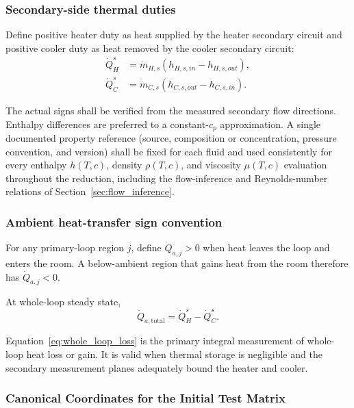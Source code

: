\documentclass[11pt]{article}
\newcommand{\QHs}{\dot Q_{H}^{s}}
\newcommand{\QCs}{\dot Q_{C}^{s}}
\begin{document}
\subsubsection{Secondary-side thermal duties}
\label{sec:secondary_duty}

Define positive heater duty as heat supplied by the heater secondary circuit and positive cooler duty as heat removed by the cooler secondary circuit:
\begin{align}
\QHs &= \dot m_{H,s}\left(h_{H,s,in}-h_{H,s,out}\right), \\
\QCs &= \dot m_{C,s}\left(h_{C,s,out}-h_{C,s,in}\right).
\end{align}

The actual signs shall be verified from the measured secondary flow directions. Enthalpy differences are preferred to a constant-$c_p$ approximation. A single documented property reference (source, composition or concentration, pressure convention, and version) shall be fixed for each fluid and used consistently for every enthalpy $h(T,c)$, density $\rho(T,c)$, and viscosity $\mu(T,c)$ evaluation throughout the reduction, including the flow-inference and Reynolds-number relations of Section~\ref{sec:flow_inference}. 

\subsubsection{Ambient heat-transfer sign convention}

For any primary-loop region $j$, define $\dot Q_{a,j}>0$ when heat leaves the loop and enters the room. A below-ambient region that gains heat from the room therefore has $\dot Q_{a,j}<0$.

At whole-loop steady state,
\begin{equation}
\dot Q_{a,\mathrm{total}}=\QHs-\QCs.
\label{eq:whole_loop_loss}
\end{equation}

Equation~\eqref{eq:whole_loop_loss} is the primary integral measurement of whole-loop heat loss or gain. It is valid when thermal storage is negligible and the secondary measurement planes adequately bound the heater and cooler.


\subsubsection{Canonical Coordinates for the Initial Test Matrix}
\end{document}
